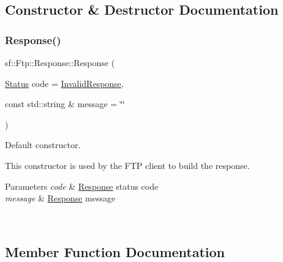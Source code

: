 \subsection{Constructor \& Destructor Documentation}
\mbox{\label{classsf_1_1_ftp_1_1_response_af300fffd4862774102f978eb22f85d9b}} 
\subsubsection{\texorpdfstring{Response()}{Response()}}
{\footnotesize\ttfamily sf\+::\+Ftp\+::\+Response\+::\+Response (\begin{DoxyParamCaption}\item[{\mbox{\hyperlink{classsf_1_1_ftp_1_1_response_af81738f06b6f571761696291276acb3b}{Status}}}]{code = {\ttfamily \mbox{\hyperlink{classsf_1_1_ftp_1_1_response_af81738f06b6f571761696291276acb3ba59e041e4ef186e8ae8d6035973fc46bd}{Invalid\+Response}}},  }\item[{const std\+::string \&}]{message = {\ttfamily \char`\"{}\char`\"{}} }\end{DoxyParamCaption})\hspace{0.3cm}{\ttfamily [explicit]}}



Default constructor. 

This constructor is used by the F\+TP client to build the response.


\begin{DoxyParams}{Parameters}
{\em code} & \mbox{\hyperlink{classsf_1_1_ftp_1_1_response}{Response}} status code \\
\hline
{\em message} & \mbox{\hyperlink{classsf_1_1_ftp_1_1_response}{Response}} message \begin{DoxyVerb}\end{DoxyVerb}
 \\
\hline
\end{DoxyParams}


\subsection{Member Function Documentation}
\mbox{\label{classsf_1_1_ftp_1_1_response_a4af82a0b3620c90558390e1f600abc05}} 
